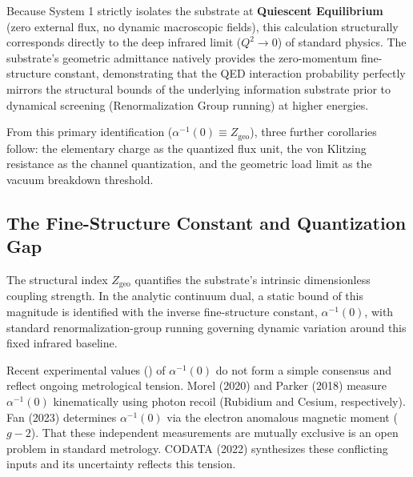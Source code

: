 Because System 1 strictly isolates the substrate at \textbf{Quiescent Equilibrium} (zero external flux, no dynamic macroscopic fields), this calculation structurally corresponds directly to the deep infrared limit ($Q^2 \to 0$) of standard physics. The substrate's geometric admittance natively provides the zero-momentum fine-structure constant, demonstrating that the QED interaction probability perfectly mirrors the structural bounds of the underlying information substrate prior to dynamical screening (Renormalization Group running) at higher energies.

From this primary identification ($\alpha^{-1}(0) \equiv Z_{\text{geo}}$), three further corollaries follow: the elementary charge as the quantized flux unit, the von Klitzing resistance as the channel quantization, and the geometric load limit as the vacuum breakdown threshold.

\subsection{The Fine-Structure Constant and Quantization Gap}
\label{sec:fine_structure}

The structural index $Z_{\text{geo}}$ quantifies the substrate's intrinsic dimensionless coupling strength. In the analytic continuum dual, a static bound of this magnitude is identified with the inverse fine-structure constant, $\alpha^{-1}(0)$, with standard renormalization-group running governing dynamic variation around this fixed infrared baseline.

Recent experimental values () of $\alpha^{-1}(0)$ do not form a simple consensus and reflect ongoing metrological tension. Morel (2020) and Parker (2018) measure $\alpha^{-1}(0)$ kinematically using photon recoil (Rubidium and Cesium, respectively). Fan (2023) determines $\alpha^{-1}(0)$ via the electron anomalous magnetic moment ($g-2$). That these independent measurements are mutually exclusive is an open problem in standard metrology. CODATA (2022) synthesizes these conflicting inputs and its uncertainty reflects this tension.

